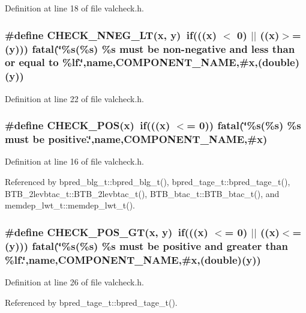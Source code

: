 Definition at line 18 of file valcheck.h.
\subsubsection[{CHECK\_\-NNEG\_\-LT}]{\setlength{\rightskip}{0pt plus 5cm}\#define CHECK\_\-NNEG\_\-LT(x, \/  y)~if(((x) $<$ 0) $|$$|$ ((x)$>$=(y))) fatal(\char`\"{}\%s(\%{\bf s}) \%{\bf s} must be non-negative and less than or equal to \%lf.\char`\"{},name,COMPONENT\_\-NAME,\#x,(double)(y))}\label{valcheck_8h_482b189474b5ba9954def6933e2fa0d1}




Definition at line 22 of file valcheck.h.
\subsubsection[{CHECK\_\-POS}]{\setlength{\rightskip}{0pt plus 5cm}\#define CHECK\_\-POS(x)~if(((x) $<$= 0)) fatal(\char`\"{}\%s(\%{\bf s}) \%{\bf s} must be positive.\char`\"{},name,COMPONENT\_\-NAME,\#x)}\label{valcheck_8h_6302c4f5461fb1f977654eb1061ba9c8}




Definition at line 16 of file valcheck.h.

Referenced by bpred\_\-blg\_\-t::bpred\_\-blg\_\-t(), bpred\_\-tage\_\-t::bpred\_\-tage\_\-t(), BTB\_\-2levbtac\_\-t::BTB\_\-2levbtac\_\-t(), BTB\_\-btac\_\-t::BTB\_\-btac\_\-t(), and memdep\_\-lwt\_\-t::memdep\_\-lwt\_\-t().
\subsubsection[{CHECK\_\-POS\_\-GT}]{\setlength{\rightskip}{0pt plus 5cm}\#define CHECK\_\-POS\_\-GT(x, \/  y)~if(((x) $<$= 0) $|$$|$ ((x)$<$=(y))) fatal(\char`\"{}\%s(\%{\bf s}) \%{\bf s} must be positive and greater than \%lf.\char`\"{},name,COMPONENT\_\-NAME,\#x,(double)(y))}\label{valcheck_8h_41b23373cb05c07ebb8aadb8dc2184e0}




Definition at line 26 of file valcheck.h.

Referenced by bpred\_\-tage\_\-t::bpred\_\-tage\_\-t().
